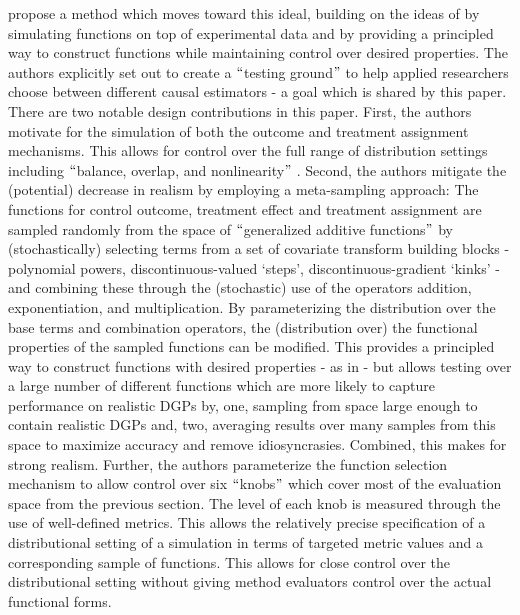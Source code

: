 \documentclass[../main.tex]{subfiles}
\begin{document}
\vspace{\baselineskip}
\cite{Dorie2019Automated1} propose a method which moves toward this ideal, building on the ideas of \cite{Hill2011BayesianInference} by simulating functions on top of experimental data and \cite{Kern2016AssessingPopulations} by providing a principled way to construct functions while maintaining control over desired properties. The authors explicitly set out to create a $``$testing ground$"$  to help applied researchers choose between different causal estimators - a goal which is shared by this paper. There are two notable design contributions in this paper. First, the authors motivate for the simulation of both the outcome and treatment assignment mechanisms. This allows for control over the full range of distribution settings including $``$balance, overlap, and nonlinearity$"$ . Second, the authors mitigate the (potential) decrease in realism by employing a meta-sampling approach: The functions for control outcome, treatment effect and treatment assignment are sampled randomly from the space of $``$generalized additive functions$"$  by (stochastically) selecting terms from a set of covariate transform building blocks - polynomial powers, discontinuous-valued ‘steps’, discontinuous-gradient ‘kinks’ - and combining these through the (stochastic) use of the operators addition, exponentiation, and multiplication. By parameterizing the distribution over the base terms and combination operators, the (distribution over) the functional properties of the sampled functions can be modified. This provides a principled way to construct functions with desired properties - as in \cite{Kern2016AssessingPopulations} - but allows testing over a large number of different functions which are more likely to capture performance on realistic DGPs by, one, sampling from space large enough to contain realistic DGPs and, two, averaging results over many samples from this space to maximize accuracy and remove idiosyncrasies. Combined, this makes for strong realism. Further, the authors parameterize the function selection mechanism to allow control over six $``$knobs$"$  which cover most of the evaluation space from the previous section. The level of each knob is measured through the use of well-defined metrics. This allows the relatively precise specification of a distributional setting of a simulation in terms of targeted metric values and a corresponding sample of functions. This allows for close control over the distributional setting without giving method evaluators control over the actual functional forms. \par
\end{document}
